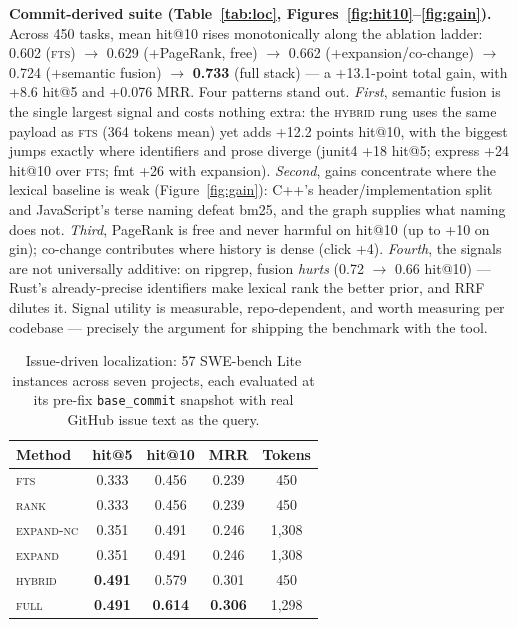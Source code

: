 \documentclass[11pt]{article}
\begin{document}
\textbf{Commit-derived suite (Table~\ref{tab:loc},
Figures~\ref{fig:hit10}--\ref{fig:gain}).}
Across 450 tasks, mean hit@10 rises monotonically along the ablation
ladder: 0.602 (\textsc{fts}) $\rightarrow$ 0.629 (+PageRank, free)
$\rightarrow$ 0.662 (+expansion/co-change) $\rightarrow$ 0.724 (+semantic
fusion) $\rightarrow$ \textbf{0.733} (full stack) --- a +13.1-point total
gain, with +8.6 hit@5 and +0.076 MRR. Four patterns stand out.
\emph{First}, semantic fusion is the single largest signal and costs
nothing extra: the \textsc{hybrid} rung uses the same payload as
\textsc{fts} (364 tokens mean) yet adds +12.2 points hit@10, with the
biggest jumps exactly where identifiers and prose diverge (junit4 +18
hit@5; express +24 hit@10 over \textsc{fts}; fmt +26 with expansion).
\emph{Second}, gains concentrate where the lexical baseline is weak
(Figure~\ref{fig:gain}): C++'s header/implementation split and JavaScript's
terse naming defeat bm25, and the graph supplies what naming does not.
\emph{Third}, PageRank is free and never harmful on hit@10 (up to +10 on
gin); co-change contributes where history is dense (click +4).
\emph{Fourth}, the signals are not universally additive: on ripgrep,
fusion \emph{hurts} (0.72 $\rightarrow$ 0.66 hit@10) --- Rust's
already-precise identifiers make lexical rank the better prior, and RRF
dilutes it. Signal utility is measurable, repo-dependent, and worth
measuring per codebase --- precisely the argument for shipping the
benchmark with the tool.

\begin{table}[t]
\centering
\caption{Issue-driven localization: 57 SWE-bench Lite instances across
seven projects, each evaluated at its pre-fix \texttt{base\_commit}
snapshot with real GitHub issue text as the query.}
\small
\begin{tabular}{lcccc}
\toprule
Method & hit@5 & hit@10 & MRR & Tokens \\
\midrule
\textsc{fts}       & 0.333 & 0.456 & 0.239 & 450 \\
\textsc{rank}      & 0.333 & 0.456 & 0.239 & 450 \\
\textsc{expand-nc} & 0.351 & 0.491 & 0.246 & 1{,}308 \\
\textsc{expand}    & 0.351 & 0.491 & 0.246 & 1{,}308 \\
\textsc{hybrid}    & \textbf{0.491} & 0.579 & 0.301 & 450 \\
\textsc{full}      & \textbf{0.491} & \textbf{0.614} & \textbf{0.306} & 1{,}298 \\
\bottomrule
\end{tabular}
\label{tab:swe}
\end{table}
\end{document}
